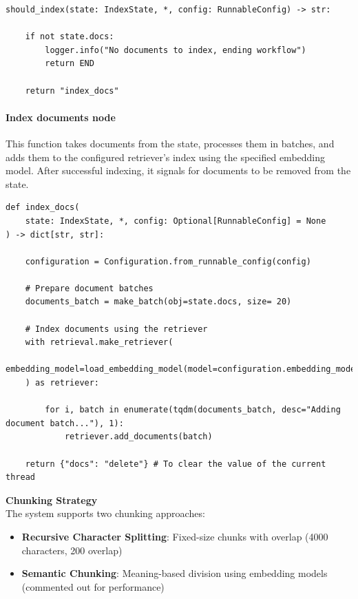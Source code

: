 \documentclass[11pt,a4paper]{report}
\begin{document}
\begin{lstlisting}[caption={Should index conditional edge}]
should_index(state: IndexState, *, config: RunnableConfig) -> str:

    if not state.docs:
        logger.info("No documents to index, ending workflow")
        return END

    return "index_docs"
\end{lstlisting}

\paragraph{Index documents node}

This function takes documents from the state, processes them in batches, and adds them to the configured retriever's index using the specified embedding model. After successful indexing, it signals for documents to be removed from the state.

\begin{lstlisting}[caption={Index doc node}]
def index_docs(
    state: IndexState, *, config: Optional[RunnableConfig] = None
) -> dict[str, str]:

    configuration = Configuration.from_runnable_config(config)
    
    # Prepare document batches
    documents_batch = make_batch(obj=state.docs, size= 20)

    # Index documents using the retriever
    with retrieval.make_retriever(
        embedding_model=load_embedding_model(model=configuration.embedding_model)
    ) as retriever:
        
        for i, batch in enumerate(tqdm(documents_batch, desc="Adding document batch..."), 1):
            retriever.add_documents(batch)

    return {"docs": "delete"} # To clear the value of the current thread
\end{lstlisting}

\textbf{Chunking Strategy}\\

The system supports two chunking approaches:

\begin{itemize}
    \item \textbf{Recursive Character Splitting}: Fixed-size chunks with overlap (4000 characters, 200 overlap)
    \item \textbf{Semantic Chunking}: Meaning-based division using embedding models (commented out for performance)
\end{itemize}
\end{document}

